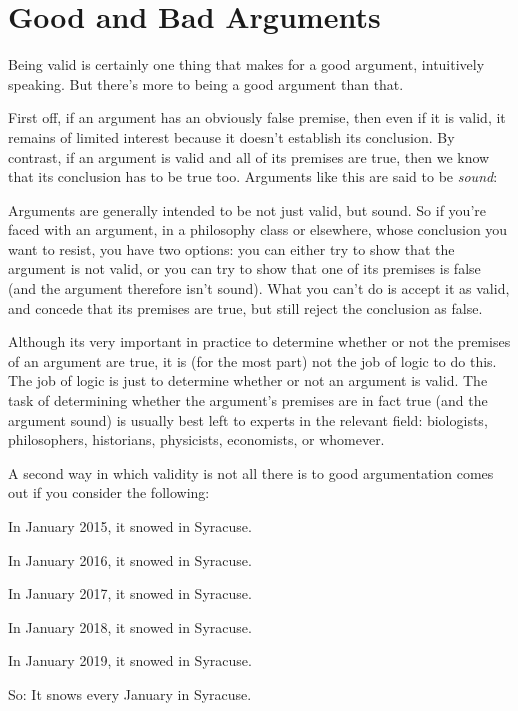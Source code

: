 \section{Good and Bad Arguments}\label{s:GoodBadArg}

Being valid is certainly one thing that makes for a good argument, intuitively speaking.  But there's more to being a good argument than that.

First off, if an argument has an obviously false premise, then even if it is valid, it remains of limited interest because it doesn't establish its conclusion.  By contrast, if an argument is valid and all of its premises are true, then we know that its conclusion has to be true too.  Arguments like this are said to be \emph{sound}:


Arguments are generally intended to be not just valid, but sound.  So if you're faced with an argument, in a philosophy class or elsewhere, whose conclusion you want to resist, you have two options: you can either try to show that the argument is not valid, or you can try to show that one of its premises is false (and the argument therefore isn't sound).  What you can't do is accept it as valid, and concede that its premises are true, but still reject the conclusion as false.

Although its very important in practice to determine whether or not the premises of an argument are true, it is (for the most part) not the job of logic to do this.  The job of logic is just to determine whether or not an argument is valid.  The task of determining whether the argument's premises are in fact true (and the argument sound) is usually best left to experts in the relevant field: biologists, philosophers, historians, physicists, economists, or whomever.

A second way in which validity is not all there is to good argumentation comes out if you consider the following:
	\begin{earg}
		\item[] In January 2015, it snowed in Syracuse.
		\item[] In January 2016, it snowed in Syracuse.
		\item[] In January 2017, it snowed in Syracuse.
		\item[] In January 2018, it snowed in Syracuse.
		\item[] In January 2019, it snowed in Syracuse.
	\item[So:] It snows every January in Syracuse.
\end{earg}

